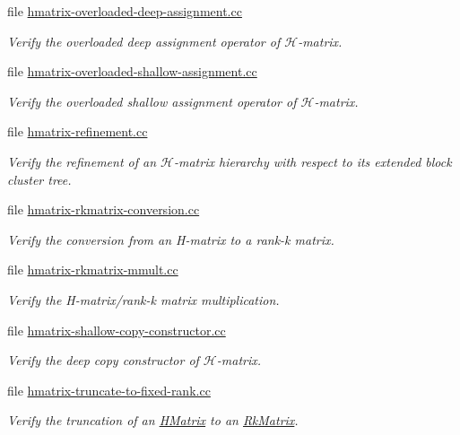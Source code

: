 \begin{DoxyCompactItemize}
file \hyperlink{hmatrix-overloaded-deep-assignment_8cc}{hmatrix-\/overloaded-\/deep-\/assignment.\+cc}
\begin{DoxyCompactList}\small\item\em Verify the overloaded deep assignment operator of $\mathcal{H}$-\/matrix. \end{DoxyCompactList}\item 
file \hyperlink{hmatrix-overloaded-shallow-assignment_8cc}{hmatrix-\/overloaded-\/shallow-\/assignment.\+cc}
\begin{DoxyCompactList}\small\item\em Verify the overloaded shallow assignment operator of $\mathcal{H}$-\/matrix. \end{DoxyCompactList}\item 
file \hyperlink{hmatrix-refinement_8cc}{hmatrix-\/refinement.\+cc}
\begin{DoxyCompactList}\small\item\em Verify the refinement of an $\mathcal{H}$-\/matrix hierarchy with respect to its extended block cluster tree. \end{DoxyCompactList}\item 
file \hyperlink{hmatrix-rkmatrix-conversion_8cc}{hmatrix-\/rkmatrix-\/conversion.\+cc}
\begin{DoxyCompactList}\small\item\em Verify the conversion from an H-\/matrix to a rank-\/k matrix. \end{DoxyCompactList}\item 
file \hyperlink{hmatrix-rkmatrix-mmult_8cc}{hmatrix-\/rkmatrix-\/mmult.\+cc}
\begin{DoxyCompactList}\small\item\em Verify the H-\/matrix/rank-\/k matrix multiplication. \end{DoxyCompactList}\item 
file \hyperlink{hmatrix-shallow-copy-constructor_8cc}{hmatrix-\/shallow-\/copy-\/constructor.\+cc}
\begin{DoxyCompactList}\small\item\em Verify the deep copy constructor of $\mathcal{H}$-\/matrix. \end{DoxyCompactList}\item 
file \hyperlink{hmatrix-truncate-to-fixed-rank_8cc}{hmatrix-\/truncate-\/to-\/fixed-\/rank.\+cc}
\begin{DoxyCompactList}\small\item\em Verify the truncation of an \hyperlink{classHMatrix}{H\+Matrix} to an \hyperlink{classRkMatrix}{Rk\+Matrix}. \end{DoxyCompactList}\item 

\end{DoxyCompactItemize}
